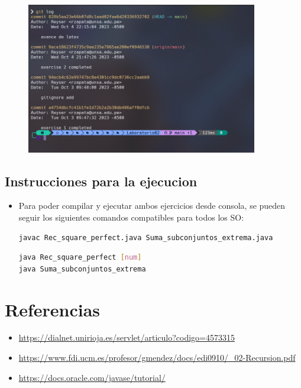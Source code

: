 \documentclass{article}
\begin{document}
	\begin{figure}[H]
		\centering
		\includegraphics[width=0.9\textwidth,keepaspectratio]{img/Commits.png}
	\end{figure}


\clearpage
\subsection{Instrucciones para la ejecucion}
\begin{itemize}	
	\item Para poder compilar y ejecutar ambos ejercicios desde consola, se pueden seguir los siguientes comandos compatibles para todos los SO:

\begin{lstlisting}[language=bash, caption={Compilación de los ejercicios}, numbers=none]
javac Rec_square_perfect.java Suma_subconjuntos_extrema.java
\end{lstlisting}

\begin{lstlisting}[language=bash, caption={Ejecución de los ejercicios}, numbers=none]
java Rec_square_perfect [num]
java Suma_subconjuntos_extrema
\end{lstlisting}


\end{itemize}	


\section{Referencias}
\begin{itemize}			
	\item \url{https://dialnet.unirioja.es/servlet/articulo?codigo=4573315}
	\item \url{https://www.fdi.ucm.es/profesor/gmendez/docs/edi0910/_02-Recursion.pdf}
    \item \url{https://docs.oracle.com/javase/tutorial/}
\end{itemize}	
\end{document}
